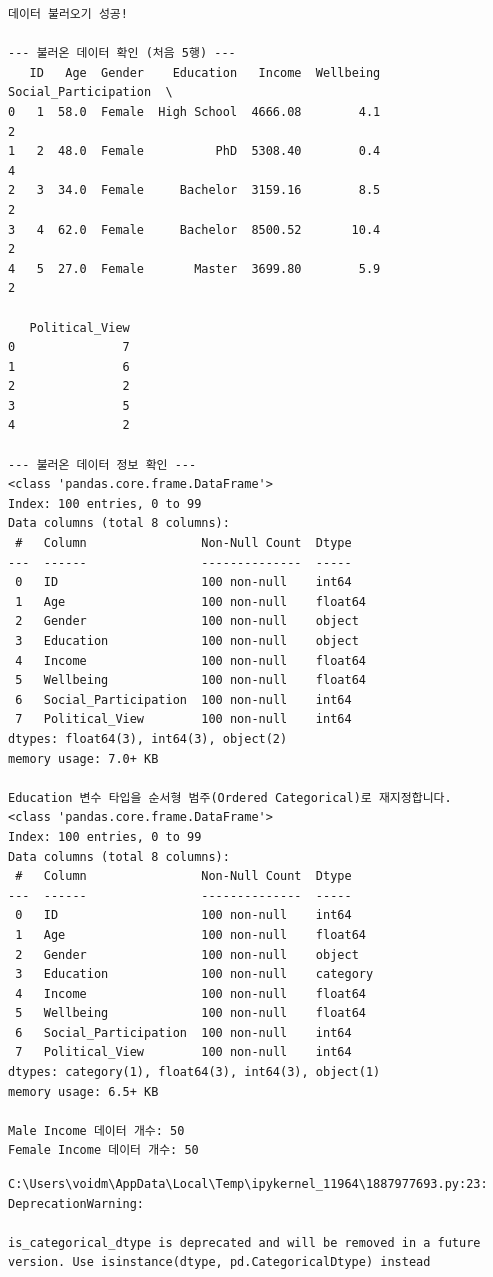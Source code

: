 \documentclass[
  letterpaper,
]{book}
\begin{document}
\begin{verbatim}
데이터 불러오기 성공!

--- 불러온 데이터 확인 (처음 5행) ---
   ID   Age  Gender    Education   Income  Wellbeing  Social_Participation  \
0   1  58.0  Female  High School  4666.08        4.1                     2   
1   2  48.0  Female          PhD  5308.40        0.4                     4   
2   3  34.0  Female     Bachelor  3159.16        8.5                     2   
3   4  62.0  Female     Bachelor  8500.52       10.4                     2   
4   5  27.0  Female       Master  3699.80        5.9                     2   

   Political_View  
0               7  
1               6  
2               2  
3               5  
4               2  

--- 불러온 데이터 정보 확인 ---
<class 'pandas.core.frame.DataFrame'>
Index: 100 entries, 0 to 99
Data columns (total 8 columns):
 #   Column                Non-Null Count  Dtype  
---  ------                --------------  -----  
 0   ID                    100 non-null    int64  
 1   Age                   100 non-null    float64
 2   Gender                100 non-null    object 
 3   Education             100 non-null    object 
 4   Income                100 non-null    float64
 5   Wellbeing             100 non-null    float64
 6   Social_Participation  100 non-null    int64  
 7   Political_View        100 non-null    int64  
dtypes: float64(3), int64(3), object(2)
memory usage: 7.0+ KB

Education 변수 타입을 순서형 범주(Ordered Categorical)로 재지정합니다.
<class 'pandas.core.frame.DataFrame'>
Index: 100 entries, 0 to 99
Data columns (total 8 columns):
 #   Column                Non-Null Count  Dtype   
---  ------                --------------  -----   
 0   ID                    100 non-null    int64   
 1   Age                   100 non-null    float64 
 2   Gender                100 non-null    object  
 3   Education             100 non-null    category
 4   Income                100 non-null    float64 
 5   Wellbeing             100 non-null    float64 
 6   Social_Participation  100 non-null    int64   
 7   Political_View        100 non-null    int64   
dtypes: category(1), float64(3), int64(3), object(1)
memory usage: 6.5+ KB

Male Income 데이터 개수: 50
Female Income 데이터 개수: 50
\end{verbatim}

\begin{verbatim}
C:\Users\voidm\AppData\Local\Temp\ipykernel_11964\1887977693.py:23: DeprecationWarning:

is_categorical_dtype is deprecated and will be removed in a future version. Use isinstance(dtype, pd.CategoricalDtype) instead
\end{verbatim}
\end{document}
